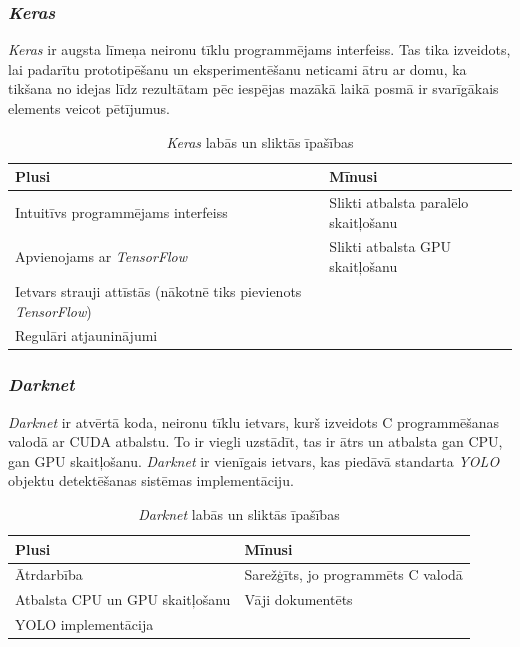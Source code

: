 \subsubsection{\textit{Keras}}

\textit{Keras} ir augsta līmeņa neironu tīklu programmējams interfeiss. Tas tika izveidots, lai padarītu prototipēšanu un eksperimentēšanu neticami ātru ar domu, ka tikšana no idejas līdz rezultātam pēc iespējas mazākā laikā posmā ir svarīgākais elements veicot pētījumus.

	\begin{table}[ht!]	
		\centering
		\begin{tabular}{ |p{7cm}|p{7cm}| }
			\hline
			\textbf{Plusi} & \textbf{Mīnusi}\\ \hline
			Intuitīvs programmējams interfeiss & Slikti atbalsta paralēlo skaitļošanu \\ \hline 
			Apvienojams ar \textit{TensorFlow} & Slikti atbalsta GPU skaitļošanu \\ \hline
			Ietvars strauji attīstās (nākotnē tiks pievienots \textit{TensorFlow})  &  \\  \hline
			Regulāri atjauninājumi & \\ \hline
		\end{tabular}
		\caption{\textit{Keras} labās un sliktās īpašības}
	\end{table}


\subsubsection{\textit{Darknet}}

\textit{Darknet} ir atvērtā koda, neironu tīklu ietvars, kurš izveidots C programmēšanas valodā ar CUDA atbalstu. To ir viegli uzstādīt, tas ir ātrs un atbalsta gan CPU, gan GPU skaitļošanu. \textit{Darknet} ir vienīgais ietvars, kas piedāvā standarta \textit{YOLO} objektu detektēšanas sistēmas implementāciju. 

	\begin{table}[ht!]
		\centering	
		\begin{tabular}{ |p{7cm}|p{7cm}| }
			\hline
			\textbf{Plusi} & \textbf{Mīnusi}\\ \hline
			Ātrdarbība & Sarežģīts, jo programmēts C valodā \\ \hline 
			Atbalsta CPU un GPU skaitļošanu & Vāji dokumentēts \\ \hline
			YOLO implementācija  &  \\  \hline
		\end{tabular}
		\caption{\textit{Darknet} labās un sliktās īpašības}
	\end{table}


